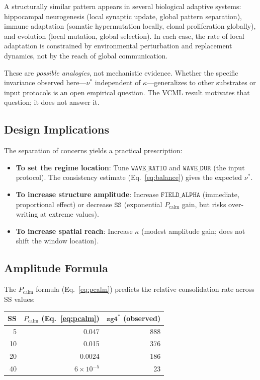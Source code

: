 \documentclass[11pt]{article}
\theoremstyle{remark}
\begin{document}
A structurally similar pattern appears in several biological adaptive systems:
hippocampal neurogenesis (local synaptic update, global pattern separation),
immune adaptation (somatic hypermutation locally, clonal proliferation globally),
and evolution (local mutation, global selection). In each case, the rate of local
adaptation is constrained by environmental perturbation and replacement dynamics,
not by the reach of global communication.

These are \emph{possible analogies}, not mechanistic evidence. Whether the
specific invariance observed here---$\nu^*$ independent of $\kappa$---generalizes
to other substrates or input protocols is an open empirical question. The
VCML result motivates that question; it does not answer it.

\subsection{Design Implications}

The separation of concerns yields a practical prescription:

\begin{itemize}
  \item \textbf{To set the regime location}: Tune $\mathtt{WAVE\_RATIO}$ and
    $\mathtt{WAVE\_DUR}$ (the input protocol). The consistency estimate
    (Eq.~\eqref{eq:balance}) gives the expected $\nu^*$.
  \item \textbf{To increase structure amplitude}: Increase $\mathtt{FIELD\_ALPHA}$
    (immediate, proportional effect) or decrease $\mathtt{SS}$ (exponential
    $P_{\text{calm}}$ gain, but risks over-writing at extreme values).
  \item \textbf{To increase spatial reach}: Increase $\kappa$ (modest amplitude
    gain; does not shift the window location).
\end{itemize}

\subsection{Amplitude Formula}

The $P_{\text{calm}}$ formula (Eq.~\eqref{eq:pcalm}) predicts the relative
consolidation rate across SS values:

\begin{center}
\begin{tabular}{rrr}
\toprule
SS & $P_{\text{calm}}$ (Eq.~\ref{eq:pcalm}) & $\mathtt{sg4}^*$ (observed) \\
\midrule
 5 & 0.047 & 888 \\
10 & 0.015 & 376 \\
20 & 0.0024 & 186 \\
40 & $6 \times 10^{-5}$ & 23 \\
\bottomrule
\end{tabular}
\end{center}
\end{document}
